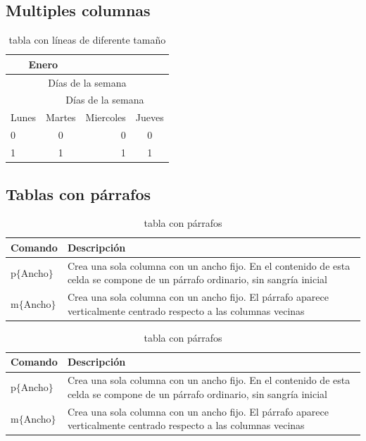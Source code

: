 \documentclass[12pt]{article}
\begin{document}
\subsection{Multiples columnas}
\begin{table}[H]
\centering
\begin{tabular}{|l|c|r|c|}
\hline
\multicolumn{2}{|c|}{Enero} & & \\
\hline
\multicolumn{4}{|c|}{Días de la semana} \\
\hline
& \multicolumn{3}{|c|}{Días de la semana} \\
\hline
Lunes & Martes & Miercoles & Jueves\\
\cline{2-4}
0 & 0 & 0 & 0 \\
\cline{3-4}
1 & 1 & 1 & 1 \\
\hline
\end{tabular}
\caption{tabla con líneas de diferente tamaño}
\label{lineas}
\end{table}

\subsection{Tablas con párrafos}
\begin{table}[H]
\centering
\begin{tabular}{|l|p{6cm}|}
\hline
Comando & Descripción \\
\hline
p$\{$Ancho$\}$ & Crea una sola columna con un ancho fijo. En el contenido de esta celda se compone de un párrafo ordinario, sin sangría inicial\\
\hline
m$\{$Ancho$\}$ & Crea una sola columna con un ancho fijo. El párrafo aparece verticalmente centrado respecto a las columnas vecinas\\
\hline
\end{tabular}
\caption{tabla con párrafos}
\label{lineas}
\end{table}
\begin{table}[H]
\centering
\begin{tabular}{|l|m{6cm}|}
\hline
Comando & Descripción \\
\hline
p$\{$Ancho$\}$ & Crea una sola columna con un ancho fijo. En el contenido de esta celda se compone de un párrafo ordinario, sin sangría inicial\\
\hline
m$\{$Ancho$\}$ & Crea una sola columna con un ancho fijo. El párrafo aparece verticalmente centrado respecto a las columnas vecinas\\
\hline
\end{tabular}
\caption{tabla con párrafos}
\label{lineas}
\end{table}
\end{document}
